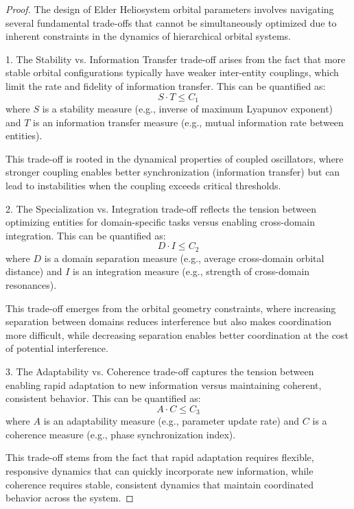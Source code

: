 \begin{proof}
The design of Elder Heliosystem orbital parameters involves navigating several fundamental trade-offs that cannot be simultaneously optimized due to inherent constraints in the dynamics of hierarchical orbital systems.

1. The Stability vs. Information Transfer trade-off arises from the fact that more stable orbital configurations typically have weaker inter-entity couplings, which limit the rate and fidelity of information transfer. This can be quantified as:
\begin{equation}
S \cdot T \leq C_1
\end{equation}
where $S$ is a stability measure (e.g., inverse of maximum Lyapunov exponent) and $T$ is an information transfer measure (e.g., mutual information rate between entities).

This trade-off is rooted in the dynamical properties of coupled oscillators, where stronger coupling enables better synchronization (information transfer) but can lead to instabilities when the coupling exceeds critical thresholds.

2. The Specialization vs. Integration trade-off reflects the tension between optimizing entities for domain-specific tasks versus enabling cross-domain integration. This can be quantified as:
\begin{equation}
D \cdot I \leq C_2
\end{equation}
where $D$ is a domain separation measure (e.g., average cross-domain orbital distance) and $I$ is an integration measure (e.g., strength of cross-domain resonances).

This trade-off emerges from the orbital geometry constraints, where increasing separation between domains reduces interference but also makes coordination more difficult, while decreasing separation enables better coordination at the cost of potential interference.

3. The Adaptability vs. Coherence trade-off captures the tension between enabling rapid adaptation to new information versus maintaining coherent, consistent behavior. This can be quantified as:
\begin{equation}
A \cdot C \leq C_3
\end{equation}
where $A$ is an adaptability measure (e.g., parameter update rate) and $C$ is a coherence measure (e.g., phase synchronization index).

This trade-off stems from the fact that rapid adaptation requires flexible, responsive dynamics that can quickly incorporate new information, while coherence requires stable, consistent dynamics that maintain coordinated behavior across the system.


\end{proof}
